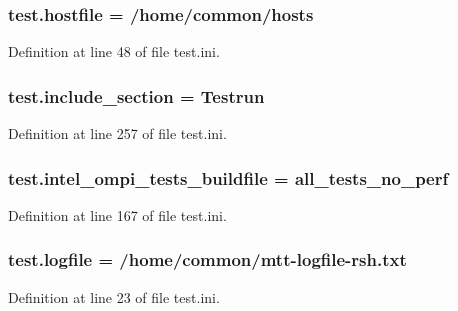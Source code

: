 \hypertarget{namespacetest_aa7f544791c7eba91f19e926b661617a1}{
\subsubsection[{hostfile}]{\setlength{\rightskip}{0pt plus 5cm}test.\-hostfile = /home/common/hosts}}\label{namespacetest_aa7f544791c7eba91f19e926b661617a1}


Definition at line 48 of file test.\-ini.

\hypertarget{namespacetest_ab8d549258085b48d9a6ab8be50b86939}{
\subsubsection[{include\-\_\-section}]{\setlength{\rightskip}{0pt plus 5cm}test.\-include\-\_\-section = Testrun}}\label{namespacetest_ab8d549258085b48d9a6ab8be50b86939}


Definition at line 257 of file test.\-ini.

\hypertarget{namespacetest_ae4fd57c0f20abaa78ea8f6e1a2dd6625}{
\subsubsection[{intel\-\_\-ompi\-\_\-tests\-\_\-buildfile}]{\setlength{\rightskip}{0pt plus 5cm}test.\-intel\-\_\-ompi\-\_\-tests\-\_\-buildfile = all\-\_\-tests\-\_\-no\-\_\-perf}}\label{namespacetest_ae4fd57c0f20abaa78ea8f6e1a2dd6625}


Definition at line 167 of file test.\-ini.

\hypertarget{namespacetest_ad95cf6979c5decba613e5a1d5ffe07a7}{
\subsubsection[{logfile}]{\setlength{\rightskip}{0pt plus 5cm}test.\-logfile = /home/common/mtt-\/logfile-\/rsh.\-txt}}\label{namespacetest_ad95cf6979c5decba613e5a1d5ffe07a7}


Definition at line 23 of file test.\-ini.

